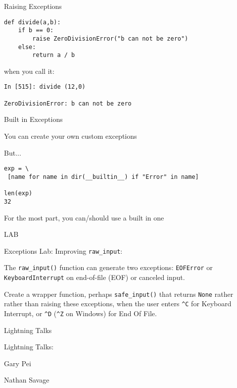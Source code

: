 \documentclass{beamer}
\begin{document}
\begin{frame}[fragile]{Raising Exceptions }

\begin{verbatim}
def divide(a,b):
    if b == 0:
        raise ZeroDivisionError("b can not be zero")
    else:
        return a / b
\end{verbatim}
\vfill
{\Large when you call it: }
\vfill
\begin{verbatim}
In [515]: divide (12,0)

ZeroDivisionError: b can not be zero
\end{verbatim}

\end{frame}



\begin{frame}[fragile]{Built in Exceptions}

{\Large You can create your own custom exceptions}

{\Large But...}

\begin{verbatim}
exp = \
 [name for name in dir(__builtin__) if "Error" in name]

len(exp)
32
\end{verbatim}

{\Large For the most part, you can/should use a built in one}

\end{frame}


\begin{frame}[fragile]{LAB}

{\Large Exceptions Lab: Improving \verb|raw_input|:}

{\large
\vfill
The \verb|raw_input()| function can generate two exceptions:
\verb|EOFError| or \verb|KeyboardInterrupt| on end-of-file
(EOF) or canceled input.

\vfill
Create a wrapper function, perhaps \verb|safe_input()| that returns
\verb|None| rather rather than raising these exceptions, when
the user enters \verb|^C| for Keyboard Interrupt, or \verb|^D|
(\verb|^Z| on Windows) for End Of File.
}

\vfill
\end{frame}

\begin{frame}{Lightning Talks}

{\LARGE Lightning Talks:}

{\Large
\vfill
Gary Pei

\vfill
Nathan Savage
}
\vfill

\end{frame}
\end{document}
